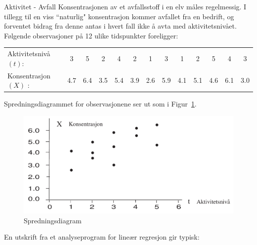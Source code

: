 \begin{eksempel}{Aktivitet - Avfall}
Konsentrasjonen av et avfallsstoff i en elv måles
regelmessig. I tillegg til en viss ``naturlig" konsentrasjon
kommer avfallet fra en bedrift, og forventet bidrag fra denne
antas i hvert fall ikke å avta med aktivitetsnivået. Følgende
observasjoner på 12 ulike tidspunkter foreligger:
\begin{center}\small \addtolength{\tabcolsep}{-0.4\tabcolsep}
\begin{tabular}{lcccccccccccc}
Aktivitetsnivå $(t)$:& 3 & 5 & 2 & 4 & 2 & 1 & 3 & 1 & 2 & 5 & 4 & 3\\    
Konsentrasjon $(X)$ :&    4.7&6.4&3.5&5.4&3.9&2.6&5.9&4.1&5.1&4.6&6.1&3.0
\end{tabular}
\end{center}
Spredningsdiagrammet for observasjonene ser ut som i Figur~\ref{fig:Spredningsdiagram}.

\begin{figure}[H]
\centering
	 \includegraphics[scale=0.7]{figurer/fig8_x.pdf} 
 \caption{Spredningsdiagram}
	\label{fig:Spredningsdiagram}
\end{figure}
En utskrift fra et analyseprogram for lineær regresjon gir typisk:

\begin{center}  \end{center}


\end{eksempel}
